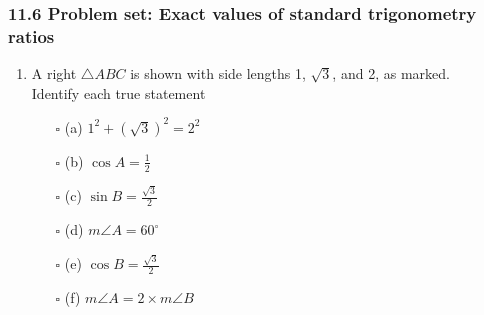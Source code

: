 \documentclass[12pt, twoside]{article}
\begin{document}
\subsubsection*{11.6 Problem set: Exact values of standard trigonometry ratios}

\begin{enumerate}

  \item A right $\triangle ABC$ is shown with side lengths 1, $\sqrt{3}$, and 2, as marked. \\[0.2cm]
  Identify each true statement%
  \begin{multicols}{2}
    \begin{enumerate}[itemsep=0.4cm]
      \item[$\square$ (a)] $\displaystyle 1^2 + (\sqrt{3})^2 = 2^2$
      \item[$\square$ (b)] $\displaystyle \cos A=\frac{1}{2}$
      \item[$\square$ (c)] $\displaystyle \sin B= \frac{\sqrt{3}}{2}$
      \item[$\square$ (d)] $m\angle A = 60^\circ$
      \item[$\square$ (e)] $\displaystyle \cos B= \frac{\sqrt{3}}{2}$
      \item[$\square$ (f)] $m\angle A = 2 \times m\angle B$
      \end{enumerate}
    \end{multicols} %


\end{enumerate}
\end{document}
